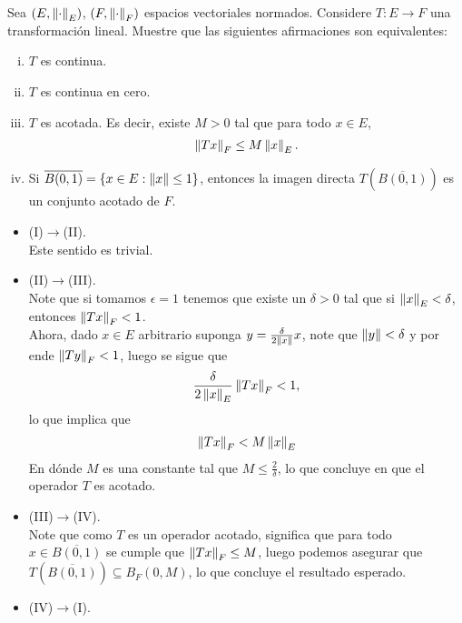 \begin{homeworkProblem}
  Sea $(E,\left\|\cdot\right\|_{E})$, $(F,\left\|\cdot\right\|_{F})$ espacios vectoriales normados. Considere $T:E\to F$ una transformación lineal. Muestre que las siguientes afirmaciones son equivalentes:
  \begin{enumerate}[(i)]
    \item $T$ es continua.
    \item $T$ es continua en cero.
    \item $T$ es acotada. Es decir, existe $M>0$ tal que para todo $x\in E$,
      \begin{align*}
        \left\|Tx\right\|_{F}\leq M\left\|x\right\|_{E}.
      \end{align*}
    \item Si $\overline{B(0,1)}=\{x\in E:\left\|x\right\|\leq 1\}$, entonces la imagen directa $T\left( \overline{B(0,1)} \right)$ es un conjunto acotado de $F$.
  \end{enumerate}
  \begin{solution}
    \begin{itemize}
      \item (I)$\to$(II).\\
        Este sentido es trivial.
      \item (II)$\to$(III).\\
        Note que si tomamos $\epsilon=1$ tenemos que existe un $\delta>0$ tal que si $\left\|x\right\|_{E}<\delta$, entonces $\left\|Tx\right\|_{F}<1$.\\
        Ahora, dado $x\in E$ arbitrario suponga $y=\frac{\delta}{2\left\|x\right\|}x$, note que $\left\|y\right\|<\delta$ y por ende $\left\|Ty\right\|_{F}<1$, luego se sigue que
        \begin{align*}
          \frac{\delta}{2\left\|x\right\|_{E}}\left\|Tx\right\|_{F}<1,
        \end{align*}
        lo que implica que
        \begin{align*}
          \left\|Tx\right\|_{F}<M\left\|x\right\|_{E}
        \end{align*}
        En dónde $M$ es una constante tal que $M\leq\frac{2}{\delta}$, lo que concluye en que el operador $T$ es acotado.
      \item (III)$\to$(IV).\\
        Note que como $T$ es un operador acotado, significa que para todo $x\in \overline{B(0,1)}$ se cumple que $\left\|Tx\right\|_{F}\leq M$, luego podemos asegurar que $T\left( \overline{B(0,1)} \right)\subseteq B_{F}(0,M)$, lo que concluye el resultado esperado.
      \item (IV)$\to$(I).\\

\end{itemize}
\end{solution}
\end{homeworkProblem}
